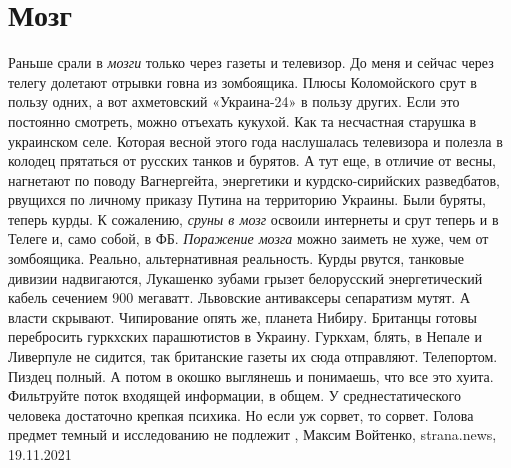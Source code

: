  
 
 
 
 
\chapter{Мозг}

Раньше срали в \emph{мозги} только через газеты и телевизор. До меня и сейчас
через телегу долетают отрывки говна из зомбоящика. Плюсы Коломойского срут в
пользу одних, а вот ахметовский «Украина-24» в пользу других. Если это
постоянно смотреть, можно отъехать кукухой. Как та несчастная старушка в
украинском селе.  Которая весной этого года наслушалась телевизора и полезла в
колодец прятаться от русских танков и бурятов. А тут еще, в отличие от весны,
нагнетают по поводу Вагнергейта, энергетики и курдско-сирийских разведбатов,
рвущихся по личному приказу Путина на территорию Украины. Были буряты, теперь
курды.  К сожалению, \emph{сруны в мозг} освоили интернеты и срут теперь и в
Телеге и, само собой, в ФБ. \emph{Поражение мозга} можно заиметь не хуже, чем
от зомбоящика. Реально, альтернативная реальность. Курды рвутся, танковые
дивизии надвигаются, Лукашенко зубами грызет белорусский энергетический кабель
сечением 900 мегаватт. Львовские антиваксеры сепаратизм мутят. А власти
скрывают.  Чипирование опять же, планета Нибиру. Британцы готовы перебросить
гуркхских парашютистов в Украину. Гуркхам, блять, в Непале и Ливерпуле не
сидится, так британские газеты их сюда отправляют. Телепортом.  Пиздец полный.
А потом в окошко выглянешь и понимаешь, что все это хуита.  Фильтруйте поток
входящей информации, в общем. У среднестатического человека достаточно крепкая
психика. Но если уж сорвет, то сорвет. Голова предмет темный и исследованию не
подлежит
, 
Максим Войтенко, strana.news, 19.11.2021
